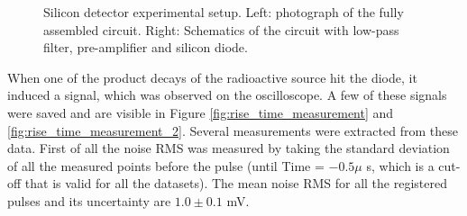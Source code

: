 \documentclass[12pt]{article}
\begin{document}
\begin{figure}[H]
\begin{subfigure}[b]{0.45\textwidth}
    \caption{}
    \label{fig:SiliconDiodeCircuit}
  \end{subfigure}
  \caption{Silicon detector experimental setup. Left: photograph of the fully assembled circuit. Right: Schematics of the circuit with low-pass filter, pre-amplifier and silicon diode.}
\end{figure}


When one of the product decays of the radioactive source hit the diode, it induced a signal, which was observed on the oscilloscope. A few of these signals were saved and are visible in Figure \ref{fig:rise_time_measurement} and \ref{fig:rise_time_measurement_2}. Several measurements were extracted from these data. First of all the noise RMS was measured by taking the standard deviation of all the measured points before the pulse (until Time = $-0.5\mu$ s, which is a cut-off that is valid for all the datasets). The mean noise RMS for all the registered pulses and its uncertainty are $1.0 \pm 0.1$ mV.
\end{document}
